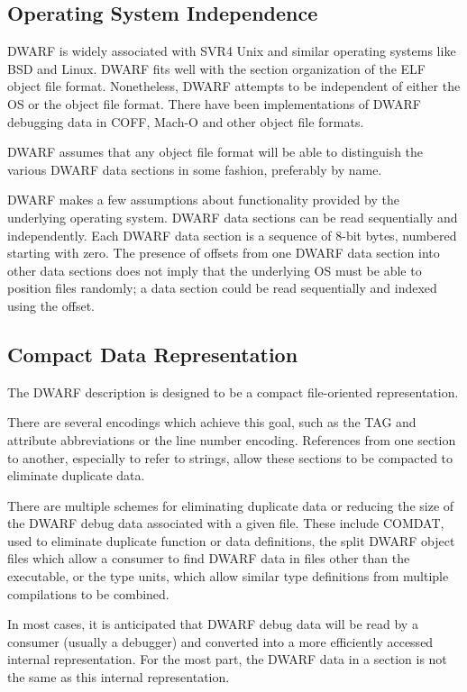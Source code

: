 \subsection{Operating System Independence}
DWARF is widely associated with SVR4 Unix and similar operating 
systems like BSD and Linux.  DWARF fits well with the section 
organization of the ELF object file format. Nonetheless, DWARF 
attempts to be independent of either the OS or the object file 
format.  There have been implementations of DWARF debugging 
data in COFF, Mach-O and other object file formats. 

DWARF assumes that any object file format will be able to 
distinguish the various DWARF data sections in some fashion, 
preferably by name. 

DWARF makes a few assumptions about functionality provided by 
the underlying operating system.  DWARF data sections can be 
read sequentially and independently.
Each DWARF data section is a sequence of 8-bit bytes, 
numbered starting with zero.  The presence of offsets from one 
DWARF data section into other data sections does not imply that 
the underlying OS must be able to position files randomly; a 
data section could be read sequentially and indexed using the offset. 

\subsection{Compact Data Representation} 
The DWARF description is designed to be a compact file-oriented 
representation. 

There are several encodings which achieve this goal, such as the 
TAG and attribute abbreviations or the line number encoding.  
References from one section to another, especially to refer to 
strings, allow these sections to be compacted to eliminate 
duplicate data. 

There are multiple schemes for eliminating duplicate data or 
reducing the size of the DWARF debug data associated with a 
given file.  These include COMDAT, used to eliminate duplicate 
function or data definitions, the split DWARF object files 
which allow a consumer to find DWARF data in files other than 
the executable, or the type units, which allow similar type 
definitions from multiple compilations to be combined. 

In most cases, it is anticipated that DWARF 
debug data will be read by a consumer (usually a debugger) and 
converted into a more efficiently accessed internal representation.  
For the most part, the DWARF data in a section is not the same as 
this internal representation.

